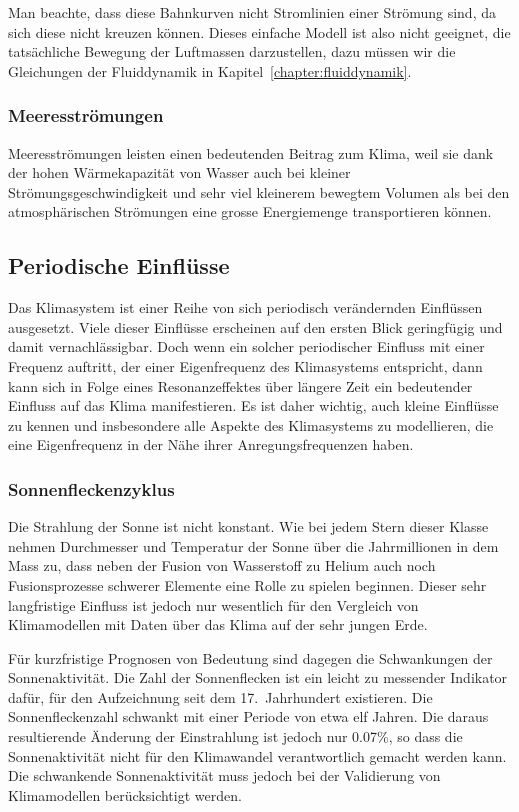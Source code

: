Man beachte, dass diese Bahnkurven nicht Stromlinien einer Strömung sind,
da sich diese nicht kreuzen können.
Dieses einfache Modell ist also nicht geeignet, die tatsächliche Bewegung
der Luftmassen darzustellen, dazu müssen wir die Gleichungen
der Fluiddynamik in Kapitel~\ref{chapter:fluiddynamik}.

\subsubsection{Meeresströmungen}
Meeresströmungen leisten einen bedeutenden Beitrag zum Klima, weil sie
dank der hohen Wärmekapazität von Wasser auch bei kleiner
Strömungsgeschwindigkeit und sehr viel kleinerem bewegtem Volumen als
bei den atmosphärischen Strömungen eine grosse Energiemenge transportieren
können.

\subsection{Periodische Einflüsse}
Das Klimasystem ist einer Reihe von sich periodisch verändernden 
Einflüssen ausgesetzt.
Viele dieser Einflüsse erscheinen auf den ersten Blick geringfügig
und damit vernachlässigbar.
Doch wenn ein solcher periodischer Einfluss mit einer Frequenz auftritt,
der einer Eigenfrequenz des Klimasystems entspricht, dann kann sich 
in Folge eines Resonanzeffektes über längere Zeit ein bedeutender 
Einfluss auf das Klima manifestieren.
Es ist daher wichtig, auch kleine Einflüsse zu kennen und insbesondere
alle Aspekte des Klimasystems zu modellieren, die eine Eigenfrequenz
in der Nähe ihrer Anregungsfrequenzen haben.

\subsubsection{Sonnenfleckenzyklus}
%
%
Die Strahlung der Sonne ist nicht konstant.
Wie bei jedem Stern dieser Klasse nehmen Durchmesser und Temperatur der
Sonne über die Jahrmillionen in dem Mass zu, dass neben der Fusion
von Wasserstoff zu Helium auch noch Fusionsprozesse schwerer Elemente
eine Rolle zu spielen beginnen.
Dieser sehr langfristige Einfluss ist jedoch nur wesentlich für
den Vergleich von Klimamodellen mit Daten über das Klima auf der sehr
jungen Erde.

Für kurzfristige Prognosen von Bedeutung sind dagegen die Schwankungen
der Sonnenaktivität.
%
Die Zahl der Sonnenflecken ist ein leicht zu messender Indikator
dafür, für den Aufzeichnung seit dem 17.~Jahrhundert existieren.
Die Sonnenfleckenzahl schwankt mit einer Periode von etwa elf Jahren.
Die daraus resultierende Änderung der Einstrahlung ist jedoch nur 0.07\%,
so dass die Sonnenaktivität nicht für den Klimawandel verantwortlich
gemacht werden kann. 
Die schwankende Sonnenaktivität muss jedoch bei der Validierung
von Klimamodellen berücksichtigt werden.


